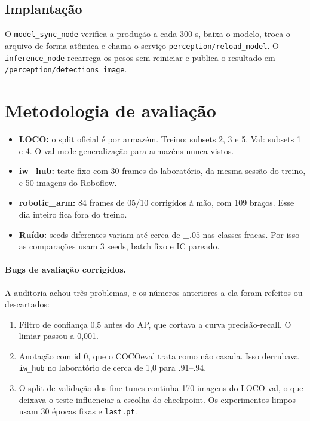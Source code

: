 \documentclass[11pt,a4paper]{article}
\begin{document}
\subsection{Implantação}

O \texttt{model\_sync\_node} verifica a produção a cada 300 s, baixa o modelo,
troca o arquivo de forma atômica e chama o serviço
\texttt{perception/reload\_model}. O \texttt{inference\_node} recarrega os pesos
sem reiniciar e publica o resultado em \texttt{/perception/detections\_image}.

\section{Metodologia de avaliação}

\begin{itemize}
  \item \textbf{LOCO:} o split oficial é por armazém. Treino: subsets 2, 3 e 5.
    Val: subsets 1 e 4. O val mede generalização para armazéns nunca vistos.
  \item \textbf{iw\_hub:} teste fixo com 30 frames do laboratório, da mesma
    sessão do treino, e 50 imagens do Roboflow.
  \item \textbf{robotic\_arm:} 84 frames de 05/10 corrigidos à mão, com 109
    braços. Esse dia inteiro fica fora do treino.
  \item \textbf{Ruído:} seeds diferentes variam até cerca de $\pm.05$ nas
    classes fracas. Por isso as comparações usam 3 seeds, batch fixo e IC
    pareado.
\end{itemize}

\paragraph{Bugs de avaliação corrigidos.} A auditoria achou três problemas, e
os números anteriores a ela foram refeitos ou descartados:
\begin{enumerate}
  \item Filtro de confiança 0,5 antes do AP, que cortava a curva
    precisão-recall. O limiar passou a 0,001.
  \item Anotação com id 0, que o COCOeval trata como não casada. Isso derrubava
    \texttt{iw\_hub} no laboratório de cerca de 1,0 para .91--.94.
  \item O split de validação dos fine-tunes continha 170 imagens do LOCO val,
    o que deixava o teste influenciar a escolha do checkpoint. Os experimentos
    limpos usam 30 épocas fixas e \texttt{last.pt}.
\end{enumerate}
\end{document}
